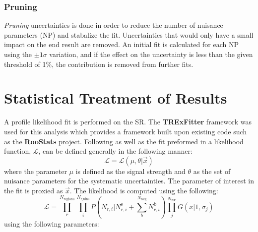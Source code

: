 \subsubsection{Pruning}
\label{sec:Pruning}
\textit{Pruning} uncertainties is done in order to reduce the number of nuisance parameters (NP) and stabalize the fit.  Uncertainties that would only have a small impact on the end result are removed.  An initial fit is calculated for each NP using the $\pm 1 \sigma$ variation, and if the effect on the uncertainty is less than the given threshold of 1\%, the contribution is removed from further fits. %

\section{Statistical Treatment of Results}
\label{sec:StatTreatment}
A profile likelihood fit is performed on the SR.  The \textbf{TRExFitter} framework \cite{TRExFitter} was used for this analysis which provides a framework built upon existing code such as the \textbf{RooStats} project\cite{Moneta:2010pm}.
Following \cite{Lista:2016chp} as well as the fit preformed in \cite{GregorFCNC} a likelihood function, $\mathcal{L}$, can be defined generally in the following manner:
\[ \mathcal{L} = \mathcal{L}(\mu,\theta|\overrightarrow{x})
\]
where the parameter $\mu$ is defined as the signal strength and $\theta$ as the set of nuisance parameters for the systematic uncertainties.  The parameter of interest in the fit is proxied as  $\overrightarrow{x}$.  The likelihood is computed using the following:
\[ \mathcal{L} = \displaystyle\prod_{r}^{N_\text{regions}}  \displaystyle\prod_{i}^{N_\text{r,bins}} P(N_{r,i}|N_{r,i}^\text{s} + \displaystyle\sum_{b}^{N_\text{bkg}}N_{r,i}^\text{b}) \displaystyle\prod_{j}^{N_\text{NP}} G(x|1,\sigma_{j})
\]
using the following parameters:
